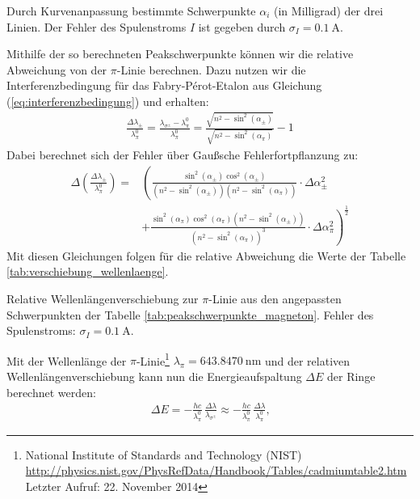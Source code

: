 \documentclass[11pt, a4paper]{article}
\begin{document}
\begin{table}[h]
	\centering
	\resizebox{\columnwidth}{!}{%
		}
	\caption{Durch Kurvenanpassung bestimmte Schwerpunkte $\alpha_i$ (in Milligrad) der drei Linien. Der Fehler des Spulenstroms $I$ ist gegeben durch $\sigma_I = \SI{0.1}{\ampere}$.}
	\label{tab:peakschwerpunkte_magneton}
\end{table}
Mithilfe der so berechneten Peakschwerpunkte können wir die relative Abweichung von der $\pi$-Linie berechnen.
Dazu nutzen wir die Interferenzbedingung für das Fabry-Pérot-Etalon aus Gleichung (\ref{eq:interferenzbedingung}) und erhalten:
\begin{align*}
	\frac{\Delta \lambda_\pm}{\lambda_\pi^0} = \frac{\lambda_{\sigma^\pm} - \lambda_\pi^0}{\lambda_\pi^0} = \frac{\sqrt{n^2 - \sin^2(\alpha_{\pm})}}{\sqrt{n^2 - \sin^2(\alpha_\pi)}} - 1
\end{align*}
Dabei berechnet sich der  Fehler über Gaußsche Fehlerfortpflanzung zu:
\begin{align*}
	\Delta \left( \frac{\Delta \lambda_\pm}{\lambda_\pi^0} \right) = & \left( \frac{\sin^2(\alpha_\pm) \cos^2(\alpha_\pm)}{(n^2-\sin^2(\alpha_\pm))(n^2-\sin^2(\alpha_\pi))} \cdot \Delta \alpha_\pm^2 \right. \nonumber\\
	& \left. + \frac{\sin^2(\alpha_\pi) \cos^2(\alpha_\pi) (n^2 - \sin^2(\alpha_\pm))}{(n^2-\sin^2(\alpha_\pi))^3} \cdot \Delta \alpha_\pi^2\right)^\frac{1}{2}
\end{align*}
Mit diesen Gleichungen folgen für die relative Abweichung die Werte der Tabelle \ref{tab:verschiebung_wellenlaenge}. 
\begin{table}[h]
	\centering
	
	\caption{Relative Wellenlängenverschiebung zur $\pi$-Linie aus den angepassten Schwerpunkten der Tabelle \ref{tab:peakschwerpunkte_magneton}. Fehler des Spulenstroms: $\sigma_I = \SI{0.1}{\ampere}$.}
	\label{tab:verschiebung_wellenlaenge}
\end{table}
Mit der Wellenlänge der $\pi$-Linie\footnote{National Institute of Standards and Technology (NIST)\\ \url{http://physics.nist.gov/PhysRefData/Handbook/Tables/cadmiumtable2.htm}\\Letzter Aufruf: 22. November 2014} $\lambda_\pi = \SI{643,8470}{\nano\metre}$  und der relativen Wellenlängenverschiebung kann nun die Energieaufspaltung $\Delta E$ der Ringe berechnet werden:
\begin{align*}
	\Delta E = -\frac{h c}{\lambda_\pi^0}\,\frac{\Delta \lambda}{\lambda_{\sigma^\pm}} \approx -\frac{h c}{\lambda_\pi^0}\,\frac{\Delta \lambda}{\lambda_\pi^0} \text{,}
\end{align*}
\end{document}
